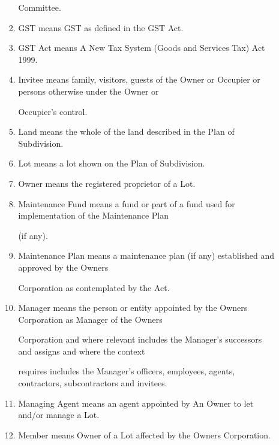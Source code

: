 \documentclass{article}
\begin{document}
\begin{enumerate}[label=\arabic*.]
\begin{enumerate}[label=\arabic{enumi}.\arabic*.]
\begin{enumerate}[label=(\arabic*)]
{\fontsize{10.02}{1}Committee. }

\item {\fontsize{9.962}{1} GST means GST as defined in the GST Act. }

\item {\fontsize{9.962}{1} GST Act means A New Tax System (Goods and Services Tax) Act 1999. }

\item {\fontsize{9.962}{1} Invitee means family, visitors, guests of the Owner or Occupier or persons otherwise under the Owner or }

{\fontsize{10.02}{1}Occupier’s control. }

\item {\fontsize{9.962}{1} Land means the whole of the land described in the Plan of Subdivision. }

\item {\fontsize{9.962}{1} Lot means a lot shown on the Plan of Subdivision. }

\item {\fontsize{9.962}{1} Owner means the registered proprietor of a Lot. }

\item {\fontsize{9.962}{1} Maintenance Fund means a fund or part of a fund used for implementation of the Maintenance Plan }

{\fontsize{10.02}{1}(if any).  }

\item {\fontsize{9.962}{1} Maintenance Plan means a maintenance plan (if any) established and approved by the Owners }

{\fontsize{10.02}{1}Corporation as contemplated by the Act.  }

\item {\fontsize{9.962}{1} Manager means the person or entity appointed by the Owners Corporation as Manager of the Owners }

{\fontsize{10.02}{1}Corporation and where relevant includes the Manager’s successors and assigns and where the context }

{\fontsize{10.02}{1}requires includes the Manager’s officers, employees, agents, contractors, subcontractors and invitees. }

\item {\fontsize{9.962}{1} Managing Agent means an agent appointed by An Owner to let and/or manage a Lot. }

\newpage

\item {\fontsize{9.962}{1} Member means Owner of a Lot affected by the Owners Corporation. }


\end{enumerate}
\end{enumerate}
\end{enumerate}
\end{document}
